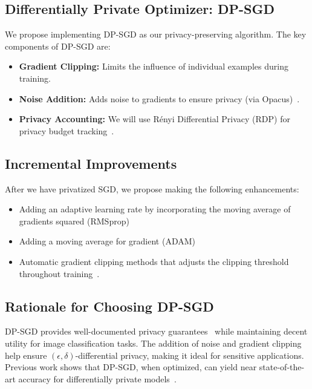 \subsection{Differentially Private Optimizer: DP-SGD}\label{subsec:differentially-private-optimizer:-dp-sgd}
We propose implementing DP-SGD as our privacy-preserving algorithm.
The key components of DP-SGD are:
\begin{itemize}
    \item \textbf{Gradient Clipping:} Limits the influence of individual examples during training.
    \item \textbf{Noise Addition:} Adds noise to gradients to ensure privacy (via Opacus)~\cite{opacus}.
    \item \textbf{Privacy Accounting:} We will use Rényi Differential Privacy (RDP) for privacy budget tracking~\cite{Mironov_2017_RenyiDP}.
\end{itemize}

\subsection{Incremental Improvements}\label{subsec:incremental-improvements}
After we have privatized SGD, we propose making the following enhancements:
\begin{itemize}
    \item Adding an adaptive learning rate by incorporating the moving average of gradients squared (RMSprop)~\cite{DBLP:journals/corr/abs-1807-06766}
    \item Adding a moving average for gradient (ADAM)~\cite{DBLP:journals/corr/abs-1807-06766}
    \item Automatic gradient clipping methods that adjusts the clipping threshold throughout training~\cite{bu2023automaticclippingdifferentiallyprivate}.
\end{itemize}

\subsection{Rationale for Choosing DP-SGD}\label{subsec:rationale-for-choosing-dp-sgd}
DP-SGD provides well-documented privacy guarantees~\cite{Abadi_2016_DeepLearningDifferentialPrivacy}
while maintaining decent utility for image classification tasks.
The addition of noise and gradient clipping help ensure $(\epsilon, \delta)$-differential privacy,
making it ideal for sensitive applications.
Previous work shows that DP-SGD, when optimized, can yield near state-of-the-art accuracy
for differentially private models~\cite{De_2022_ScaleDP_ImageClassification}.

